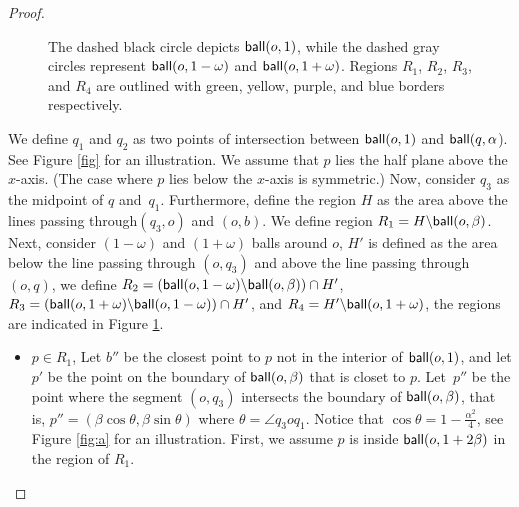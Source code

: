 \documentclass[11pt]{article}
\newcommand{\ball}{{\sf ball}}
\begin{document}
\begin{proof}
\begin{figure}[h]
{}
     \centering
     \tikzIX
      \caption{ \footnotesize The dashed black circle depicts $\ball(o,1)$, while the dashed gray circles represent $\ball(o, 1-\omega)$ and $\ball(o,1+\omega)$. Regions $R_1$, $R_2$, $R_3$, and $R_4$ are outlined with green, yellow, purple, and blue borders respectively.}
        \label{fig:regions}  
\end{figure}
We define $q_1$ and $q_2$ as two points of intersection between $\ball(o,1)$ and $\ball (q, \alpha$). See Figure \ref{fig} for an illustration. We assume that $p$ lies the half plane above the $x$-axis. (The case where $p$ lies below the $x$-axis is symmetric.) Now, consider $q_3$ as the midpoint of $q$ and~$q_1$. Furthermore, define the region $H$ as the area above the lines passing through$(q_3 , o)$ and $(o,b)$. We define region $R_1 = H \backslash \ball(o , \beta)$.  Next, consider $(1-\omega)$ and $(1+ \omega)$ balls around $o$, $H'$ is defined as the area below the line passing through $(o, q_3)$ and above the line passing through $(o, q)$, we define $R_2 = (\ball(o, 1-\omega)\backslash \ball (o,\beta))\cap H'$, $R_3= (\ball(o, 1+\omega)\backslash \ball (o, 1-\omega))\cap H'$, and $ R_4=  H'\backslash \ball ( o , 1+ \omega)$, the regions are indicated in Figure \ref{fig:regions}.
\begin{itemize}
   \item $p \in R_1$, Let $b''$ be the closest point to $p$ not in the interior of $\ball(o,1)$, and let $p'$ be the point on the boundary of $\ball(o , \beta)$ that is closet to $p$. Let~$p''$ be the point where the segment $(o,q_3)$ intersects the boundary of $\ball(o,\beta)$, that is, $p''= (\beta \cos{\theta} , \beta \sin {\theta})$ where $\theta=\angle q_3 o q_1$. Notice that $\cos{\theta} = 1 - \frac{\alpha^2}{4}$, see Figure \ref{fig:a} for an illustration. First, we assume $p$ is inside $\ball(o,1+2\beta)$ in the region of $R_1$.

 
\begin{figure}[ht]

\newcommand{\tikzI}{
\begin{tikzpicture}
    \draw[color=black,  dashed, thick](0,0) circle (2);
    \draw[color=blue!60, inner color=white, thin](0,0) circle (0.5);
    \filldraw[black] (0,0) circle (1pt) node[anchor=south ]{\small $o$};
    \draw[black, thin] (0,0) -- (2,0) ;
    

\end{tikzpicture}}
\end{figure}
\end{itemize}
\end{proof}
\end{document}
